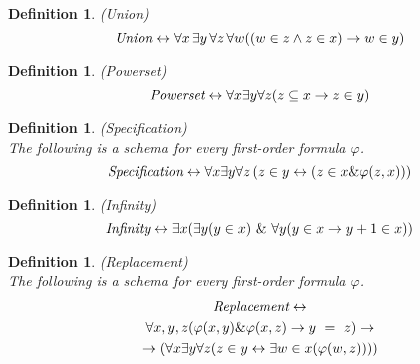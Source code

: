 \documentclass[12pt,a4paper]{article}
\newtheorem{definition}[theorem]{Definition}
\renewcommand{\iff}{\leftrightarrow}
\newcommand{\then}{\rightarrow}
\begin{document}
\begin{definition}{(\emph{Union})}\label{def:union}\\
\begin{equation}
\emph{Union} \iff \forall x \,\exists y \, \forall z\, \forall w ((w \in z \land z \in x) \then w \in y)
\end{equation}
\end{definition}

\begin{definition}{(\emph{Powerset})}\label{def:powerset}\\
\begin{equation}
\emph{Powerset} \iff \forall x \exists y \forall z (z \subseteq x \then z \in y)
\end{equation}
\end{definition}

\begin{definition}{(\emph{Specification})}\label{def:specification}\\
The following is a schema for every first-order formula $\varphi$.
\begin{equation}
\emph{Specification} \iff \forall x \exists y \forall z \, ( z \in y \iff ( z \in x \& \varphi(z, x)))
\end{equation}
\end{definition}

\begin{definition}{(\emph{Infinity})}\label{def:infinity}\\
\begin{equation}
\emph{Infinity} \iff \exists x (\exists y (y \in x)\ \&\ \forall y(y \in x \then y+1 \in x))
\end{equation}
\end{definition}

\begin{definition}{(\emph{Replacement})}\label{def:replacement}\\
The following is a schema for every first-order formula $\varphi$.
\begin{equation}
\begin{gathered}
\emph{Replacement} \iff\\
\forall x, y, z (\varphi(x, y) \& \varphi(x, z) \then y\ =\ z) \then \\
\then (\forall x \exists y \forall z (z \in y \iff \exists w \in x (\varphi(w, z))))
\end{gathered}
\end{equation}
\end{definition}
\end{document}
